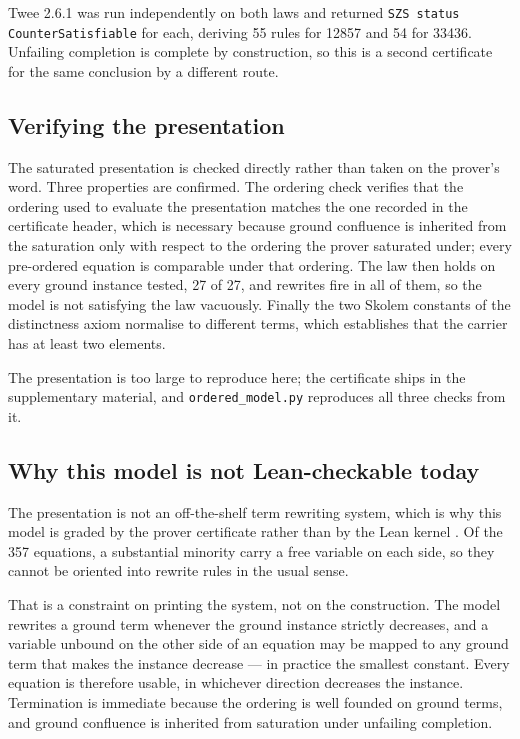 \documentclass[letterpaper]{article}
\begin{document}
Twee 2.6.1 \citep{smallbone2021twee} was run independently on both laws and returned \texttt{SZS status
CounterSatisfiable} for each, deriving 55 rules for 12857 and 54 for 33436.
Unfailing completion is complete by construction, so this is a second
certificate for the same conclusion by a different route.

\subsection{Verifying the presentation}

The saturated presentation is checked directly rather than taken on the
prover's word. Three properties are confirmed. The ordering check verifies that
the ordering used to evaluate the presentation matches the one recorded in the
certificate header, which is necessary because ground confluence is inherited
from the saturation only with respect to the ordering the prover saturated
under; every pre-ordered equation is comparable under that ordering. The law
then holds on every ground instance tested, 27 of 27, and rewrites fire in all
of them, so the model is not satisfying the law vacuously. Finally the two
Skolem constants of the distinctness axiom normalise to different terms, which
establishes that the carrier has at least two elements.

The presentation is too large to reproduce here; the certificate ships in the
supplementary material, and \texttt{ordered\_model.py} reproduces all three
checks from it.

\subsection{Why this model is not Lean-checkable today}

The presentation is not an off-the-shelf term rewriting system, which is why
this model is graded by the prover certificate rather than by the Lean kernel
\citep{moura2021lean}.
Of the 357 equations, a substantial minority carry a free variable on each
side, so they cannot be oriented into rewrite rules in the usual sense.

That is a constraint on printing the system, not on the construction. The model
rewrites a ground term whenever the ground instance strictly decreases, and a
variable unbound on the other side of an equation may be mapped to any ground
term that makes the instance decrease --- in practice the smallest constant.
Every equation is therefore usable, in whichever direction decreases the
instance. Termination is immediate because the ordering is well founded on
ground terms, and ground confluence is inherited from saturation under
unfailing completion.
\end{document}
